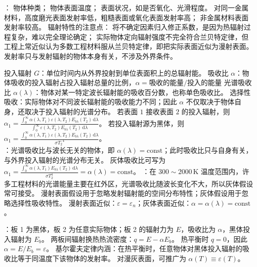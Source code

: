 ：
物体种类；
物体表面温度；
表面状况，如是否氧化、光滑程度。
对同一金属材料，高度磨光表面发射率低，粗糙表面或氧化表面发射率高；
非金属材料表面发射率较高。
辐射特性的注意点：
将不确定因素归入修正系数，是因为热辐射过程复杂，难以完全理论确定；
实际物体定向辐射强度不完全符合兰贝特定律，但工程上常近似认为多数工程材料服从兰贝特定律，即把实际表面近似为漫射表面。
发射率只与发射辐射的物体本身有关，不涉及外界条件。

\divider


投入辐射 $G$：单位时间内从外界投射到单位表面积上的总辐射能。
吸收比 $\alpha$：物体吸收的投入辐射占投入辐射总量的比例，$\alpha=\text{吸收的能量}/\text{投入的能量}$
光谱吸收比 $\alpha(\lambda)$：物体对某一特定波长辐射能的吸收百分数，也称单色吸收比。
选择性吸收：实际物体对不同波长辐射能的吸收能力不同；因此 $\alpha$ 不仅取决于物体自身，还取决于投入辐射的光谱分布。
若表面 $1$ 接收表面 $2$ 的投入辐射，则 $\alpha_1=\frac{\int_0^\infty \alpha(\lambda,T_1)\varepsilon(\lambda,T_2)E_{b\lambda}(T_2)\,\mathrm{d}\lambda}{\int_0^\infty \varepsilon(\lambda,T_2)E_{b\lambda}(T_2)\,\mathrm{d}\lambda}$。
若投入辐射源为黑体，则 $\alpha_1=\frac{\int_0^\infty \alpha(\lambda,T_1)\varepsilon(\lambda,T_2)E_{b\lambda}(T_2)\,\mathrm{d}\lambda}{\sigma {T_2}^4}$。\\
：光谱吸收比与波长无关的物体，即 $\alpha(\lambda)=\mathrm{const}$；此时吸收比只与自身有关，与外界投入辐射的光谱分布无关。
灰体吸收比可写为 $\alpha_1=\frac{\int_0^\infty \alpha(\lambda,T_1)E_{b\lambda}(T_2)\,\mathrm{d}\lambda}{\sigma T_2^4}=\alpha(\lambda)=\mathrm{const}$。
：在 $300\sim2000\,\mathrm{K}$ 温度范围内，许多工程材料的光谱能量主要在红外区，光谱吸收比随波长变化不大，所以灰体假设常可接受。
漫射表面假设用于忽略发射辐射能的空间分布特性；灰体假设用于忽略选择性吸收特性。
漫射表面近似：$\varepsilon=\varepsilon_n$；灰体表面近似：$\alpha=\alpha(\lambda)=\mathrm{const}$。

：板 1 为黑体，板 2 为任意实际物体；板 2 的辐射力为 $E$，吸收比为 $\alpha$，黑体投入辐射为 $E_b$。
两板间辐射换热热流密度：$q=E-\alpha E_b$。
热平衡时 $q=0$，因此 $\alpha=E/E_b=\varepsilon$。
基尔霍夫定律内涵：在热平衡时，任意物体对黑体投入辐射的吸收比等于同温度下该物体的发射率。
对漫灰表面，可推广为 $\alpha(T)\equiv\varepsilon(T)$。

